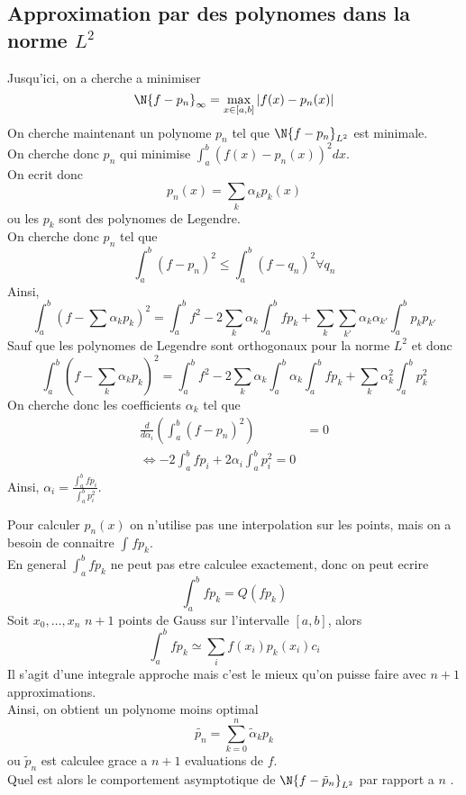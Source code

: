 \subsection{Approximation par des polynomes dans la norme $L^{2}$ }
Jusqu'ici, on a cherche a minimiser 
\[ 
\N { f-p_n} _{ \infty }  = \max_{x\in [ a,b] }  |f( x) - p_n( x) |
\]
On cherche maintenant un polynome $p_n$ tel que $ \N { f- p_n}_{ L^{2}} $ est minimale.\\
On cherche donc $p_n$ qui minimise $ \int_{ a }^{ b } ( f( x) - p_n( x) )^{2} dx$.\\
On ecrit donc
\[ 
p_n( x) = \sum_k \alpha_k p_k( x) 
\]
ou les $p_k$ sont des polynomes de Legendre.\\
On cherche donc $p_n$ tel que
\[ 
\int_{ a }^{ b } ( f-p_n) ^{2} \leq  \int_{ a }^{ b } ( f-q_n) ^{2} \forall q_n
\]
Ainsi,
\[ 
\int_{ a }^{ b } ( f- \sum \alpha_k p_k)^{2} = \int_{ a }^{ b } f^{2} - 2 \sum_k \alpha_k \int_{ a }^{ b } f p_k + \sum_k \sum_{ k'} \alpha_k \alpha_{ k'} \int_{ a }^{ b } p_k p_{k'} 
\]
Sauf que les polynomes de Legendre sont orthogonaux pour la norme $L^{2}$ et donc
\[ 
\int_{ a }^{ b } ( f- \sum_k \alpha_k p_k) ^{2} = \int_{ a }^{ b } f^{2} - 2\sum_k \alpha_k \int_{ a }^{ b } \alpha_k \int_{ a }^{ b } f p_k + \sum_k \alpha_k^{2} \int_{ a }^{ b } p_k^{2}
\]
On cherche donc les coefficients $\alpha_k$ tel que
\begin{align*}
	\frac{d}{d \alpha_i} ( \int_{ a }^{ b } ( f- p_n)^{2}) &= 0\\
\iff -2 \int_{ a }^{ b } f p_i + 2 \alpha_i  \int_{ a }^{ b }p_i ^{2}=0
\end{align*}
Ainsi, $\alpha_i = \frac{ \int_{ a }^{ b } f p_i}{\int_{ a }^{ b } p_i ^{2}}$.\\
\begin{rmq}
Pour calculer $p_n( x) $ on n'utilise pas une interpolation sur les points, mais on a besoin de connaitre $ \int_{  }^{  } f p_k$.\\
En general $ \int_{ a }^{ b } f p_k $ ne peut pas etre calculee exactement, donc on peut ecrire
\[ 
\int_{ a }^{ b } f p_k = Q( f p_k) 
\]
Soit $x_0,\ldots,x_n$ $n+1$ points de Gauss sur l'intervalle $ [ a,b] $, alors 
\[ 
\int_{ a }^{ b } fp_k \simeq \sum_i f( x_i)  p_k( x_i) c_i
\]
Il s'agit d'une integrale approche mais c'est le mieux qu'on puisse faire avec $n+1$ approximations.\\
Ainsi, on obtient un polynome moins optimal
\[ 
	\tilde{p_n} = \sum_{k=0}^{n}\tilde { \alpha}_k p_k
\]
ou $\tilde { p} _n$ est calculee grace a $n+1$ evaluations de $f$.\\

Quel est alors le comportement asymptotique de $ \N { f- \tilde { p} _n}_{ L^{2}} $ par rapport a $n$ .
\end{rmq}




	

	

	

